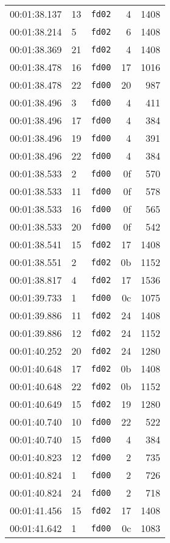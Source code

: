 \documentclass{article}
\begin{document}
\begin{longtable}{lllrr}
00:01:38.137 & 13 & \texttt{fd02} & 4 & 1408 \\
00:01:38.214 & 5 & \texttt{fd02} & 6 & 1408 \\
00:01:38.369 & 21 & \texttt{fd02} & 4 & 1408 \\
00:01:38.478 & 16 & \texttt{fd00} & 17 & 1016 \\
00:01:38.478 & 22 & \texttt{fd00} & 20 & 987 \\
00:01:38.496 & 3 & \texttt{fd00} & 4 & 411 \\
00:01:38.496 & 17 & \texttt{fd00} & 4 & 384 \\
00:01:38.496 & 19 & \texttt{fd00} & 4 & 391 \\
00:01:38.496 & 22 & \texttt{fd00} & 4 & 384 \\
00:01:38.533 & 2 & \texttt{fd00} & 0f & 570 \\
00:01:38.533 & 11 & \texttt{fd00} & 0f & 578 \\
00:01:38.533 & 16 & \texttt{fd00} & 0f & 565 \\
00:01:38.533 & 20 & \texttt{fd00} & 0f & 542 \\
00:01:38.541 & 15 & \texttt{fd02} & 17 & 1408 \\
00:01:38.551 & 2 & \texttt{fd02} & 0b & 1152 \\
00:01:38.817 & 4 & \texttt{fd02} & 17 & 1536 \\
00:01:39.733 & 1 & \texttt{fd00} & 0c & 1075 \\
00:01:39.886 & 11 & \texttt{fd02} & 24 & 1408 \\
00:01:39.886 & 12 & \texttt{fd02} & 24 & 1152 \\
00:01:40.252 & 20 & \texttt{fd02} & 24 & 1280 \\
00:01:40.648 & 17 & \texttt{fd02} & 0b & 1408 \\
00:01:40.648 & 22 & \texttt{fd02} & 0b & 1152 \\
00:01:40.649 & 15 & \texttt{fd02} & 19 & 1280 \\
00:01:40.740 & 10 & \texttt{fd00} & 22 & 522 \\
00:01:40.740 & 15 & \texttt{fd00} & 4 & 384 \\
00:01:40.823 & 12 & \texttt{fd00} & 2 & 735 \\
00:01:40.824 & 1 & \texttt{fd00} & 2 & 726 \\
00:01:40.824 & 24 & \texttt{fd00} & 2 & 718 \\
00:01:41.456 & 15 & \texttt{fd02} & 17 & 1408 \\
00:01:41.642 & 1 & \texttt{fd00} & 0c & 1083 \\

\end{longtable}
\end{document}
